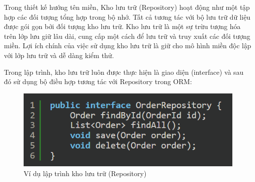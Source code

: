  Trong thiết kế hướng tên miền,       Kho lưu trữ (Repository)        hoạt động như một tập hợp các đối tượng tổng hợp trong bộ nhớ.      Tất cả     tương tác với bộ lưu trữ dữ liệu được gói gọn bởi đối tượng kho lưu trữ.    Kho lưu trữ    là một sự trừu tượng hóa trên lớp lưu giữ lâu dài, cung cấp một cách để lưu trữ và truy xuất các đối tượng miền.       Lợi ích chính của việc sử dụng kho lưu trữ là   giữ cho mô hình miền độc lập với lớp lưu trữ và dễ dàng kiểm thử.
 
 

 
 
 
  
 
 
 
 





 


\begin{example} Trong lập trình,  kho lưu trữ luôn được thực hiện là giao diện (interface) và sau đó sử dụng  bộ điều hợp  tương tác với    Repository trong ORM:

    
\begin{figure}[H]

    \centering
    
    \includegraphics[scale = 0.8]{pictures/_vi_du_lap_trinh_kho_luu_tru_repository/main.png}
    
    \caption{Ví dụ  lập trình  kho lưu trữ (Repository)}
    
    \end{figure}
\end{example}





